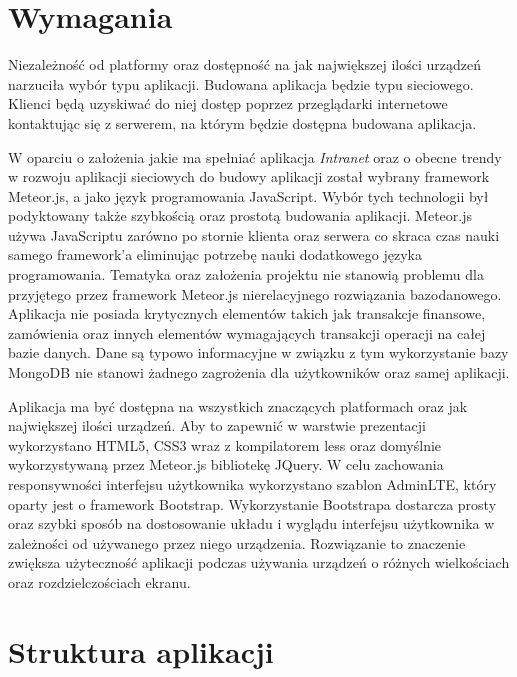\section{Wymagania}

Niezależność od platformy oraz dostępność na jak największej ilości urządzeń narzuciła wybór typu aplikacji. Budowana aplikacja będzie typu sieciowego. Klienci będą uzyskiwać do niej dostęp poprzez przeglądarki internetowe kontaktując się z serwerem, na którym będzie dostępna budowana aplikacja. 

W oparciu o założenia jakie ma spełniać aplikacja \emph{Intranet} oraz o obecne trendy w rozwoju aplikacji sieciowych do budowy aplikacji został wybrany framework Meteor.js, a jako język programowania JavaScript. Wybór tych technologii był podyktowany także szybkością oraz prostotą budowania aplikacji. Meteor.js używa JavaScriptu zarówno po stornie klienta oraz serwera co skraca czas nauki samego framework'a eliminując potrzebę nauki dodatkowego języka programowania. Tematyka oraz założenia projektu nie stanowią problemu dla przyjętego przez framework Meteor.js nierelacyjnego rozwiązania bazodanowego. Aplikacja nie posiada krytycznych elementów takich jak transakcje finansowe, zamówienia oraz innych elementów wymagających transakcji operacji na całej bazie danych. Dane są typowo informacyjne w związku z tym wykorzystanie bazy MongoDB nie stanowi żadnego zagrożenia dla użytkowników oraz samej aplikacji.

Aplikacja ma być dostępna na wszystkich znaczących platformach oraz jak największej ilości urządzeń. Aby to zapewnić w warstwie prezentacji wykorzystano HTML5, CSS3 wraz z kompilatorem less oraz domyślnie wykorzystywaną przez Meteor.js bibliotekę JQuery. W celu zachowania responsywności interfejsu użytkownika wykorzystano szablon AdminLTE, który oparty jest o framework Bootstrap. Wykorzystanie Bootstrapa dostarcza prosty oraz szybki sposób na dostosowanie układu i wyglądu interfejsu użytkownika w zależności od używanego przez niego urządzenia. Rozwiązanie to znaczenie zwiększa użyteczność aplikacji podczas używania urządzeń o różnych wielkościach oraz rozdzielczościach ekranu. 

\section{Struktura aplikacji}

